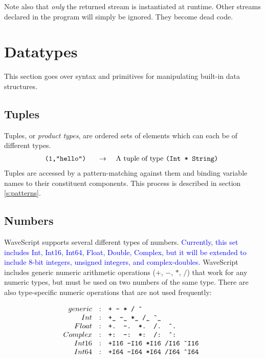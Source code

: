 \documentclass[twocolumn]{report}
\newcommand{\rednote}[1]{{\textcolor{blue}{#1}}}
\newcommand{\evalsto}[2]{\[ \begin{array}{rcl}
$\tt #1 $&$ \arr $&$ #2 $
\end{array} \]}
\newcommand{\arr}{\ensuremath{\rightarrow}}
\newenvironment{wscode}{\begin{center}\tt}{\end{center}}
\begin{document}
Note also that {\em only} the returned stream is instantiated at runtime.
Other streams declared in the program will simply be ignored.  They
become dead code.


\section{Datatypes}

This section goes over syntax and primitives for manipulating
built-in data structures.

\subsection{Tuples}

Tuples, or {\em product types}, are ordered sets of elements which can
each be of different types. 
\evalsto{(1,``hello'')}{A tuple of type {\tt (Int * String)}}
Tuples are accessed by a pattern-matching against them and binding
variable names to their constituent components.  This process is
described in section \ref{s:patterns}.

\subsection{Numbers}

WaveScript supports several different types of numbers.  \rednote{Currently,
this set includes Int, Int16, Int64, Float, Double, Complex, but it will be extended
to include 8-bit integers, unsigned integers, and complex-doubles.}
WaveScript includes generic numeric arithmetic operations ($+$, $-$,
$*$, $/$) that work for any numeric types, but must be used on two
numbers of the same type.  There are also type-specific numeric
operations that are not used frequently:

\[
\begin{array}{rcl}
generic          & : & $\tt + - * / \^{}$   \\
Int              & : & $\tt +\_ -\_ *\_ /\_ \^{}\_ $ \\
Float            & : & $\tt +. -. *. /. \^{}. $ \\
Complex          & : & $\tt +: -: *: /: \^{}: $ \\
Int16            & : & $\tt +I16 -I16 *I16 /I16 \^{}I16 $   \\
Int64            & : & $\tt +I64 -I64 *I64 /I64 \^{}I64 $   \\
\end{array}
\]
\end{document}

